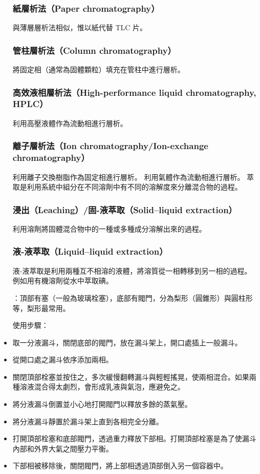 \documentclass[a4paper,12pt]{article}
\begin{document}
\begin{itemize}
\subsubsection{紙層析法（Paper chromatography）}
與薄層層析法相似，惟以紙代替 TLC 片。
\subsubsection{管柱層析法（Column chromatography）}
將固定相（通常為固體顆粒）填充在管柱中進行層析。
\subsubsection{高效液相層析法（High-performance liquid chromatography, HPLC）}
利用高壓液體作為流動相進行層析。
\subsubsection{離子層析法（Ion chromatography/Ion-exchange chromatography）}
利用離子交換樹脂作為固定相進行層析。
利用氣體作為流動相進行層析。
萃取是利用系統中組分在不同溶劑中有不同的溶解度來分離混合物的過程。
\subsubsection{浸出（Leaching）/固-液萃取（Solid–liquid extraction）}
利用溶劑將固體混合物中的一種或多種成分溶解出來的過程。
\subsubsection{液-液萃取（Liquid–liquid extraction）}
液-液萃取是利用兩種互不相溶的液體，將溶質從一相轉移到另一相的過程。例如用有機溶劑從水中萃取碘。

：頂部有塞（一般為玻璃栓塞），底部有閥門，分為梨形（圓錐形）與圓柱形等，梨形最常用。

使用步驟：
\ben
\item 取一分液漏斗，關閉底部的閥門，放在漏斗架上，開口處插上一般漏斗。
\item 從開口處之漏斗依序添加兩相。
\item 關閉頂部栓塞並按住之，多次緩慢翻轉漏斗與輕輕搖晃，使兩相混合。如果兩種溶液混合得太劇烈，會形成乳液與氣泡，應避免之。
\item 將分液漏斗倒置並小心地打開閥門以釋放多餘的蒸氣壓。
\item 將分液漏斗靜置於漏斗架上直到各相完全分離。
\item 打開頂部栓塞和底部閥門，透過重力釋放下部相。打開頂部栓塞是為了使漏斗內部和外界大氣之間壓力平衡。
\item 下部相被移除後，關閉閥門，將上部相透過頂部倒入另一個容器中。
\een

\end{itemize}
\end{document}
